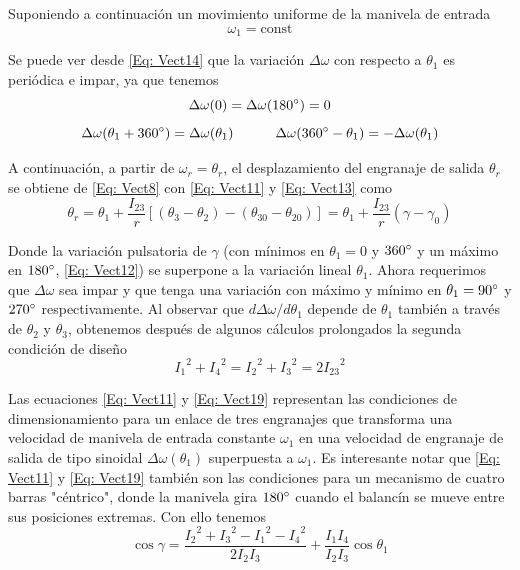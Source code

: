 \documentclass[12pt, final]{extarticle}
\begin{document}
Suponiendo a continuación un movimiento uniforme de la manivela de entrada
\begin{equation}
    \omega_1=\text{const}
   \label{Eq: Vect15}
\end{equation}

Se puede ver desde \eqref{Eq: Vect14} que la variación $\Delta\omega$ con
respecto a $\theta_1$ es periódica e impar, ya que tenemos
\begin{equation}
\Delta\omega(0)=\Delta\omega(180\degree)=0
   \label{Eq: Vect16}
\end{equation}
\begin{equation}
    \Delta\omega(\theta_1+360\degree)=\Delta\omega(\theta_1)  \quad\quad\quad \Delta\omega(360\degree-\theta_1)=-\Delta\omega(\theta_1)
   \label{Eq: Vect17}
\end{equation}

A continuación, a partir de $\omega_r=\theta_r$, el desplazamiento del engranaje
de salida $\theta_r$ se obtiene de \eqref{Eq: Vect8} con \eqref{Eq: Vect11} y
\eqref{Eq: Vect13} como
\begin{equation}
    \theta_r=\theta_1+\frac{I_{23}}{r}[(\theta_3-\theta_2)-(\theta_{30}-\theta_{20})]=\theta_1+\frac{I_{23}}{r}(\gamma-\gamma_0)
   \label{Eq: Vect18}
\end{equation}

Donde la variación pulsatoria de $\gamma$ (con mínimos en $\theta_1=0$ y
$360\degree$ y un máximo en $180\degree$, \eqref{Eq: Vect12}) se superpone a la
variación lineal $\theta_1$. Ahora requerimos que $\Delta\omega$ sea impar y que
tenga una variación con máximo y mínimo en $\theta_1=90\degree$ y $270\degree$
respectivamente. Al observar que $d\Delta\omega/d\theta_1$ depende de $\theta_1$
también a través de $\theta_2$ y $\theta_3$, obtenemos después de algunos
cálculos prolongados la segunda condición de diseño
\begin{equation}
    {I_1}^2+{I_4}^2={I_2}^2+{I_3}^2=2{I_{23}}^2
   \label{Eq: Vect19}
\end{equation}

Las ecuaciones \eqref{Eq: Vect11} y \eqref{Eq: Vect19} representan las
condiciones de dimensionamiento para un enlace de tres engranajes que transforma
una velocidad de manivela de entrada constante $\omega_1$ en una velocidad de
engranaje de salida de tipo sinoidal $\Delta\omega(\theta_1)$ superpuesta a
$\omega_1$. Es interesante notar que \eqref{Eq: Vect11} y \eqref{Eq: Vect19}
también son las condiciones para un mecanismo de cuatro barras "céntrico", donde
la manivela gira $180\degree$ cuando el balancín se mueve entre sus posiciones
extremas. Con ello tenemos
\begin{equation}
    \cos{\gamma}=\frac{{I_2}^2+{I_3}^2-{I_1}^2-{I_4}^2}{2{I_2 I_3}}+\frac{I_1 I_4}{I_2 I_3}\cos{\theta_1}
   \label{Eq: Vect20}
\end{equation}
\end{document}
